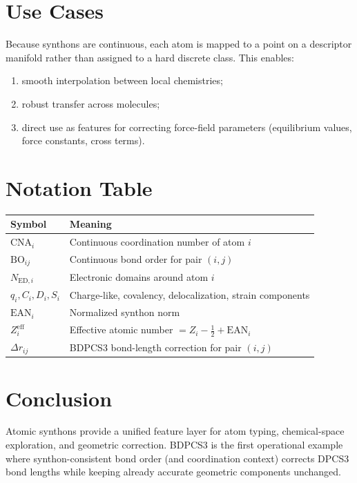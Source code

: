 \documentclass[a4paper,11pt]{article}
\begin{document}
\section{Use Cases}
Because synthons are continuous, each atom is mapped to a point on a descriptor manifold rather than assigned to a hard discrete class. This enables:
\begin{enumerate}
\item smooth interpolation between local chemistries;
\item robust transfer across molecules;
\item direct use as features for correcting force-field parameters (equilibrium values, force constants, cross terms).
\end{enumerate}

\section{Notation Table}
\begin{table}[h]
\centering
\begin{tabular}{ll}
\toprule
Symbol & Meaning \\
\midrule
$\mathrm{CNA}_i$ & Continuous coordination number of atom $i$ \\
$\mathrm{BO}_{ij}$ & Continuous bond order for pair $(i,j)$ \\
$N_{\mathrm{ED},i}$ & Electronic domains around atom $i$ \\
$q_i,C_i,D_i,S_i$ & Charge-like, covalency, delocalization, strain components \\
$\mathrm{EAN}_i$ & Normalized synthon norm \\
$Z_i^{\mathrm{eff}}$ & Effective atomic number $=Z_i-\frac12+\mathrm{EAN}_i$ \\
$\Delta r_{ij}$ & BDPCS3 bond-length correction for pair $(i,j)$ \\
\bottomrule
\end{tabular}
\end{table}

\section{Conclusion}
Atomic synthons provide a unified feature layer for atom typing, chemical-space exploration, and geometric correction. BDPCS3 is the first operational example where synthon-consistent bond order (and coordination context) corrects DPCS3 bond lengths while keeping already accurate geometric components unchanged.
\end{document}
